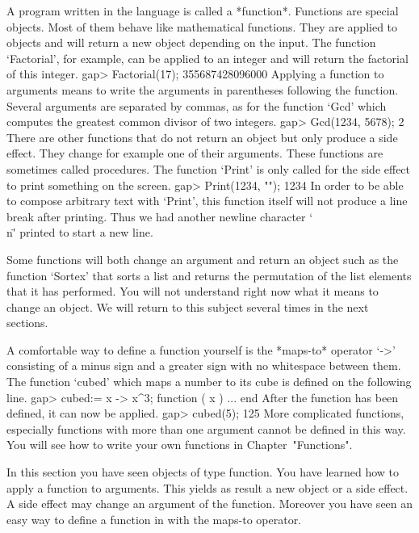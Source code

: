 A  program  written  in  the  {\GAP} language  is  called  a  *function*.
Functions  are   special  {\GAP}  objects.   Most  of  them  behave  like
mathematical functions.  They are applied to  objects and  will return  a
new  object  depending  on  the input.   The  function  `Factorial',  for
example,  can be applied to an  integer and will  return the factorial of
this integer.
\beginexample
    gap> Factorial(17);
    355687428096000 
\endexample
Applying  a  function  to arguments  means  to  write  the  arguments  in
parentheses following the function.   Several arguments are  separated by
commas, as for the  function  `Gcd' which  computes  the greatest  common
divisor of two integers.
\beginexample
    gap> Gcd(1234, 5678);
    2 
\endexample
There are other functions that do not return an object but only produce a
side effect.   They change for  example  one of their  arguments.   These
functions are sometimes called  procedures.  The function `Print' is only
called for the side effect to print something on the screen.
\beginexample
    gap> Print(1234, "\n");
    1234 
\endexample
In order to be able to compose arbitrary text with `Print', this function
itself will not produce a line break  after printing. Thus we had another
newline character `\"\\n\"' printed to start a new line.

Some functions will both change an argument  and return an object such as
the function `Sortex'  that sorts a  list and returns the permutation  of
the list  elements that it has  performed.  You will not understand right
now what it means  to change an object.   We will return to this  subject
several times in the next sections.

%
A comfortable way to define a function yourself is the *maps-to* operator
`->' consisting of  a minus sign and a   greater sign with  no whitespace
between them. The function  `cubed' which maps a  number  to its  cube is
defined on the following line.
\beginexample
    gap> cubed:= x -> x^3;
    function ( x ) ... end 
\endexample
After the function has been defined, it can now be applied.
\beginexample
    gap> cubed(5);
    125 
\endexample
More complicated  functions,  especially functions   with  more than  one
argument cannot be  defined in this way. You  will see how to  write your
own   {\GAP}   functions in Chapter~"Functions".

In  this section you have seen {\GAP} objects of type function.  You have
learned how to apply a function to  arguments.  This  yields as result  a
new object or a side effect.  A side effect may change an argument of the
function.   Moreover you have seen an easy  way  to define a  function in
{\GAP} with the maps-to operator.

